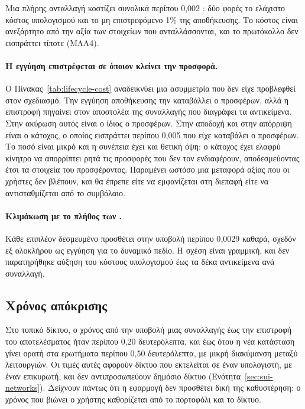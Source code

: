 Μια πλήρης ανταλλαγή κοστίζει συνολικά περίπου 0{,}002 : δύο φορές το ελάχιστο
κόστος υπολογισμού και το μη επιστρεφόμενο 1\% της αποθήκευσης. Το κόστος είναι
ανεξάρτητο από την αξία των στοιχείων που ανταλλάσσονται, και το πρωτόκολλο δεν εισπράττει
τίποτε (ΜΛΑ4).

\paragraph{Η εγγύηση επιστρέφεται σε όποιον κλείνει την προσφορά.} Ο
Πίνακας~\ref{tab:lifecycle-cost} αναδεικνύει μια ασυμμετρία που δεν είχε προβλεφθεί στον
σχεδιασμό. Την εγγύηση αποθήκευσης την καταβάλλει ο προσφέρων, αλλά η επιστροφή πηγαίνει
στον αποστολέα της συναλλαγής που διαγράφει τα αντικείμενα. Στην ακύρωση αυτός είναι ο
ίδιος ο προσφέρων. Στην αποδοχή και στην απόρριψη είναι ο κάτοχος, ο οποίος εισπράττει
περίπου 0{,}005  που είχε καταβάλει ο προσφέρων. Το ποσό είναι μικρό και η
συνέπεια έχει και θετική όψη: ο κάτοχος έχει ελαφρύ κίνητρο να απορρίπτει ρητά τις
προσφορές που δεν τον ενδιαφέρουν, αποδεσμεύοντας έτσι τα στοιχεία του προσφέροντος.
Παραμένει ωστόσο μια μεταφορά αξίας που οι χρήστες δεν βλέπουν, και θα έπρεπε είτε να
εμφανίζεται στη διεπαφή είτε να αντισταθμίζεται από το συμβόλαιο.

\paragraph{Κλιμάκωση με το πλήθος των .} Κάθε επιπλέον δεσμευμένο 
προσθέτει στην υποβολή περίπου 0{,}0029  καθαρά, σχεδόν εξ ολοκλήρου ως
εγγύηση για το δυναμικό πεδίο. Η σχέση είναι γραμμική, και δεν παρατηρήθηκε αύξηση του
κόστους υπολογισμού έως τα δέκα αντικείμενα ανά συναλλαγή.

\subsection{Χρόνος απόκρισης}

Στο τοπικό δίκτυο, ο χρόνος από την υποβολή μιας συναλλαγής έως την επιστροφή του
αποτελέσματος ήταν περίπου 0{,}20 δευτερόλεπτα, και έως ότου η νέα κατάσταση γίνει ορατή
στα ερωτήματα περίπου 0{,}50 δευτερόλεπτα, με μικρή διακύμανση μεταξύ λειτουργιών. Οι
τιμές αυτές αφορούν δίκτυο που εκτελείται σε έναν υπολογιστή, με έναν επικυρωτή, και δεν
αντιπροσωπεύουν δημόσιο δίκτυο (Ενότητα~\ref{sec:sui-networks}). Δείχνουν πάντως ότι η εφαρμογή δεν προσθέτει δική της καθυστέρηση: ο
χρόνος που βιώνει ο χρήστης καθορίζεται από το πορτοφόλι και το δίκτυο.


